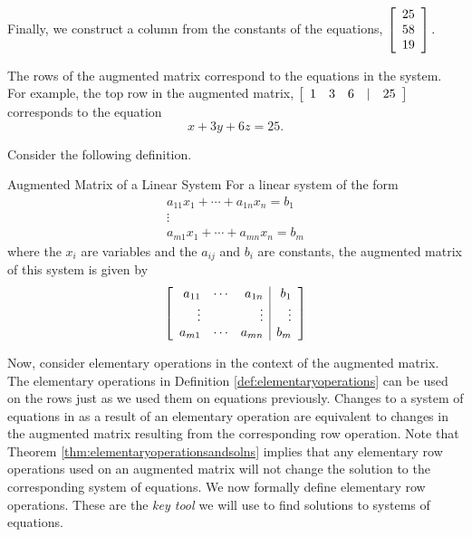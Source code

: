 Finally, we construct a column from the constants of the equations,
$\left[
\begin{array}{r}
25\\
58\\
19
\end{array}
\right] .$ 

The rows of the augmented matrix correspond to the equations in the system. For example, the top
row in the augmented matrix, 
$\left[
\begin{array}{rrrrr}
1 & 3 & 6 & | & 25
\end{array}
\right]$
 corresponds to the equation
\begin{equation*}
x+3y+6z=25.
\end{equation*}

Consider the following definition. 

\begin{definition}{Augmented Matrix of a Linear System}\label{def:augmentedmatrix}
For a linear system of the form
\begin{equation*}
\begin{array}{c}
a_{11}x_{1}+\cdots +a_{1n}x_{n}=b_{1} \\
\vdots \\
a_{m1}x_{1}+\cdots +a_{mn}x_{n}=b_{m}
\end{array}
\end{equation*}
where the $x_{i}$ are variables and the $a_{ij}$ and $b_{i}$ are constants, 
the augmented matrix  of this system is given by 
\begin{equation*}
\left[
\begin{array}{rrr|r}
a_{11} & \cdots & a_{1n} &  b_{1} \\
\vdots &  & \vdots &  \vdots \\
a_{m1} & \cdots & a_{mn} &  b_{m}
\end{array}
\right] 
\end{equation*}
\end{definition}

Now, consider elementary operations in the context of the augmented matrix. The elementary operations in Definition \ref{def:elementaryoperations}
can be used on the rows just as we used them on equations previously. Changes to a system of equations in as a result of an
elementary operation are equivalent to changes in the augmented matrix resulting from the corresponding row operation. Note that Theorem \ref{thm:elementaryoperationsandsolns} implies that
any elementary row operations used on an augmented matrix will not change the solution to the corresponding system of equations.
We now formally define elementary row operations. These are the {\em key tool \em}we will use to find solutions to systems of equations. 

